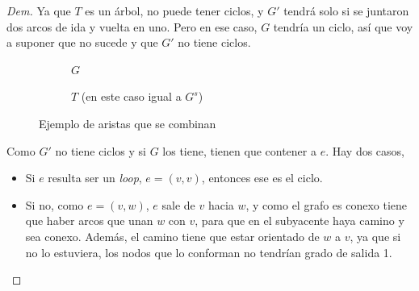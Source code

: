 \documentclass[12pt, a4paper]{report}
\theoremstyle{definition} %
\begin{document}
\begin{enumerate}[a)]
\begin{proof}[Dem]
    Ya que $T$ es un árbol, no puede tener ciclos, y $G'$ tendrá solo si se juntaron dos arcos de ida y vuelta en uno. Pero en ese caso, $G$ tendría un ciclo, así que voy a suponer que no sucede y que $G'$ no tiene ciclos.

    \begin{figure}[H]
        \centering
        \begin{subfigure}{0.4\textwidth}
            \centering
            \caption*{$G$}
        \end{subfigure}
        \begin{subfigure}{0.4\textwidth}
            \centering
            \caption*{$T$ (en este caso igual a $G^s$)}
        \end{subfigure}
        \caption*{Ejemplo de aristas que se combinan}
    \end{figure}

    Como $G'$ no tiene ciclos y si $G$ los tiene, tienen que contener a $e$. Hay dos casos,

    \begin{itemize}
        \item Si $e$ resulta ser un \textit{loop}, $e = (v, v)$, entonces ese es el ciclo.
        \item Si no, como $e = (v, w)$, $e$ sale de $v$ hacia $w$, y como el grafo es conexo tiene que haber arcos que unan $w$ con $v$, para que en el subyacente haya camino y sea conexo. Además, el camino tiene que estar orientado de $w$ a $v$, ya que si no lo estuviera, los nodos que lo conforman no tendrían grado de salida 1.


\end{itemize}
\end{proof}
\end{enumerate}
\end{document}
